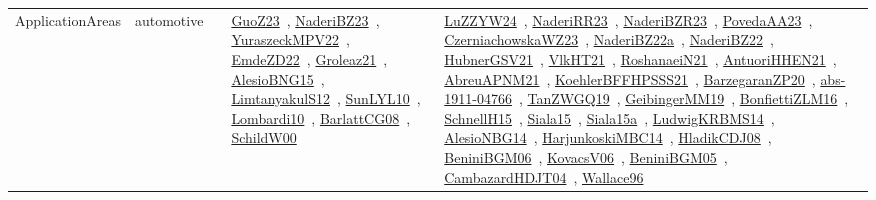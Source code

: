 {\begin{longtable}{lp{3cm}>{\raggedright\arraybackslash}p{6cm}>{\raggedright\arraybackslash}p{6cm}>{\raggedright\arraybackslash}p{8cm}}
\index{automotive}\index{ApplicationAreas!automotive}ApplicationAreas & automotive &  & \href{../works/GuoZ23.pdf}{GuoZ23}~\cite{GuoZ23}, \href{../works/NaderiBZ23.pdf}{NaderiBZ23}~\cite{NaderiBZ23}, \href{../works/YuraszeckMPV22.pdf}{YuraszeckMPV22}~\cite{YuraszeckMPV22}, \href{../works/EmdeZD22.pdf}{EmdeZD22}~\cite{EmdeZD22}, \href{../works/Groleaz21.pdf}{Groleaz21}~\cite{Groleaz21}, \href{../works/AlesioBNG15.pdf}{AlesioBNG15}~\cite{AlesioBNG15}, \href{../works/LimtanyakulS12.pdf}{LimtanyakulS12}~\cite{LimtanyakulS12}, \href{../works/SunLYL10.pdf}{SunLYL10}~\cite{SunLYL10}, \href{../works/Lombardi10.pdf}{Lombardi10}~\cite{Lombardi10}, \href{../works/BarlattCG08.pdf}{BarlattCG08}~\cite{BarlattCG08}, \href{../works/SchildW00.pdf}{SchildW00}~\cite{SchildW00} & \href{../works/LuZZYW24.pdf}{LuZZYW24}~\cite{LuZZYW24}, \href{../works/NaderiRR23.pdf}{NaderiRR23}~\cite{NaderiRR23}, \href{../works/NaderiBZR23.pdf}{NaderiBZR23}~\cite{NaderiBZR23}, \href{../works/PovedaAA23.pdf}{PovedaAA23}~\cite{PovedaAA23}, \href{../works/CzerniachowskaWZ23.pdf}{CzerniachowskaWZ23}~\cite{CzerniachowskaWZ23}, \href{../works/NaderiBZ22a.pdf}{NaderiBZ22a}~\cite{NaderiBZ22a}, \href{../works/NaderiBZ22.pdf}{NaderiBZ22}~\cite{NaderiBZ22}, \href{../works/HubnerGSV21.pdf}{HubnerGSV21}~\cite{HubnerGSV21}, \href{../works/VlkHT21.pdf}{VlkHT21}~\cite{VlkHT21}, \href{../works/RoshanaeiN21.pdf}{RoshanaeiN21}~\cite{RoshanaeiN21}, \href{../works/AntuoriHHEN21.pdf}{AntuoriHHEN21}~\cite{AntuoriHHEN21}, \href{../works/AbreuAPNM21.pdf}{AbreuAPNM21}~\cite{AbreuAPNM21}, \href{../works/KoehlerBFFHPSSS21.pdf}{KoehlerBFFHPSSS21}~\cite{KoehlerBFFHPSSS21}, \href{../works/BarzegaranZP20.pdf}{BarzegaranZP20}~\cite{BarzegaranZP20}, \href{../works/abs-1911-04766.pdf}{abs-1911-04766}~\cite{abs-1911-04766}, \href{../works/TanZWGQ19.pdf}{TanZWGQ19}~\cite{TanZWGQ19}, \href{../works/GeibingerMM19.pdf}{GeibingerMM19}~\cite{GeibingerMM19}, \href{../works/BonfiettiZLM16.pdf}{BonfiettiZLM16}~\cite{BonfiettiZLM16}, \href{../works/SchnellH15.pdf}{SchnellH15}~\cite{SchnellH15}, \href{../works/Siala15.pdf}{Siala15}~\cite{Siala15}, \href{../works/Siala15a.pdf}{Siala15a}~\cite{Siala15a}, \href{../works/LudwigKRBMS14.pdf}{LudwigKRBMS14}~\cite{LudwigKRBMS14}, \href{../works/AlesioNBG14.pdf}{AlesioNBG14}~\cite{AlesioNBG14}, \href{../works/HarjunkoskiMBC14.pdf}{HarjunkoskiMBC14}~\cite{HarjunkoskiMBC14}, \href{../works/HladikCDJ08.pdf}{HladikCDJ08}~\cite{HladikCDJ08}, \href{../works/BeniniBGM06.pdf}{BeniniBGM06}~\cite{BeniniBGM06}, \href{../works/KovacsV06.pdf}{KovacsV06}~\cite{KovacsV06}, \href{../works/BeniniBGM05.pdf}{BeniniBGM05}~\cite{BeniniBGM05}, \href{../works/CambazardHDJT04.pdf}{CambazardHDJT04}~\cite{CambazardHDJT04}, \href{../works/Wallace96.pdf}{Wallace96}~\cite{Wallace96}\\

\end{longtable}}
